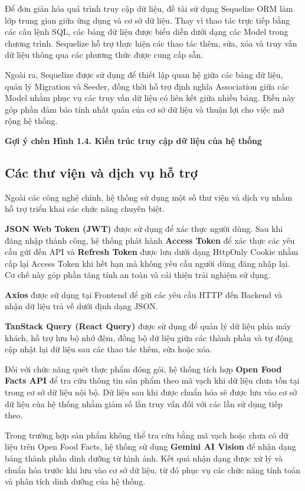 \documentclass[12pt, a4paper]{report}
\begin{document}
Để đơn giản hóa quá trình truy cập dữ liệu, đề tài sử dụng Sequelize ORM làm lớp trung gian giữa ứng dụng và cơ sở dữ liệu. Thay vì thao tác trực tiếp bằng các câu lệnh SQL, các bảng dữ liệu được biểu diễn dưới dạng các Model trong chương trình. Sequelize hỗ trợ thực hiện các thao tác thêm, sửa, xóa và truy vấn dữ liệu thông qua các phương thức được cung cấp sẵn.

Ngoài ra, Sequelize được sử dụng để thiết lập quan hệ giữa các bảng dữ liệu, quản lý Migration và Seeder, đồng thời hỗ trợ định nghĩa Association giữa các Model nhằm phục vụ các truy vấn dữ liệu có liên kết giữa nhiều bảng. Điều này góp phần đảm bảo tính nhất quán của cơ sở dữ liệu và thuận lợi cho việc mở rộng hệ thống.

\textbf{Gợi ý chèn Hình 1.4. Kiến trúc truy cập dữ liệu của hệ thống}

\subsection{Các thư viện và dịch vụ hỗ trợ}Ngoài các công nghệ chính, hệ thống sử dụng một số thư viện và dịch vụ nhằm hỗ trợ triển khai các chức năng chuyên biệt.

\textbf{JSON Web Token (JWT)} được sử dụng để xác thực người dùng. Sau khi đăng nhập thành công, hệ thống phát hành \textbf{Access Token} để xác thực các yêu cầu gửi đến API và \textbf{Refresh Token} được lưu dưới dạng HttpOnly Cookie nhằm cấp lại Access Token khi hết hạn mà không yêu cầu người dùng đăng nhập lại. Cơ chế này góp phần tăng tính an toàn và cải thiện trải nghiệm sử dụng.

\textbf{Axios} được sử dụng tại Frontend để gửi các yêu cầu HTTP đến Backend và nhận dữ liệu trả về dưới định dạng JSON.

\textbf{TanStack Query (React Query)} được sử dụng để quản lý dữ liệu phía máy khách, hỗ trợ lưu bộ nhớ đệm, đồng bộ dữ liệu giữa các thành phần và tự động cập nhật lại dữ liệu sau các thao tác thêm, sửa hoặc xóa.

Đối với chức năng quét thực phẩm đóng gói, hệ thống tích hợp \textbf{Open Food Facts API} để tra cứu thông tin sản phẩm theo mã vạch khi dữ liệu chưa tồn tại trong cơ sở dữ liệu nội bộ. Dữ liệu sau khi được chuẩn hóa sẽ được lưu vào cơ sở dữ liệu của hệ thống nhằm giảm số lần truy vấn đối với các lần sử dụng tiếp theo.

Trong trường hợp sản phẩm không thể tra cứu bằng mã vạch hoặc chưa có dữ liệu trên Open Food Facts, hệ thống sử dụng \textbf{Gemini AI Vision} để nhận dạng bảng thành phần dinh dưỡng từ hình ảnh. Kết quả nhận dạng được xử lý và chuẩn hóa trước khi lưu vào cơ sở dữ liệu, từ đó phục vụ các chức năng tính toán và phân tích dinh dưỡng của hệ thống.
\end{document}
